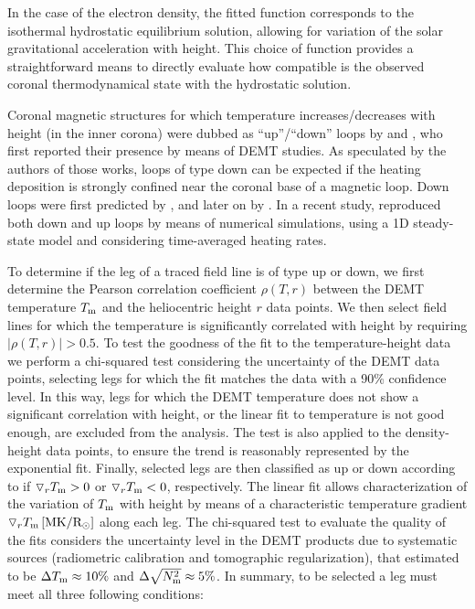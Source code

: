 \documentclass[namedreferences]{solarphysics}
\newcommand{\mrsun}{{\rm R_\odot}}
\newcommand{\MK}{{\rm MK}}
\newcommand{\dr}{\triangledown_r}
\newcommand{\Tm}{T_{\rm m}}
\newcommand{\Nsqm}{N^2_{{\rm m}}}
\newcommand{\rhoTr}{\rho(T,r)}
\newcommand{\sqravgN}{\sqrt{\Nsqm}}
\begin{document}
\begin{article}
In the case of the electron density, the fitted function corresponds to the isothermal hydrostatic equilibrium solution, allowing for variation of the solar gravitational acceleration with height. This choice of function provides a straightforward means to directly evaluate how compatible is the observed coronal thermodynamical state with the hydrostatic solution.

{Coronal magnetic structures for which temperature increases/decreases with height (in the inner corona) were dubbed as “up”/“down” loops by \citet{huang_2012} and \citet{nuevo_2013}, who first reported their presence by means of DEMT studies. As speculated by the authors of those works, loops of type down can be expected if the heating deposition is strongly confined near the coronal base of a magnetic loop. Down loops were first predicted by \citet{serio_1981}, and later on by \citet{aschwanden_2002}. In a recent study, \citet{schiff_2016} reproduced both down and up loops by means of numerical simulations, using a 1D steady-state model and {considering time-averaged heating rates.}}

{To determine if the leg of a traced field line is} of type up or down, we first determine the Pearson correlation coefficient $\rhoTr$ between the DEMT temperature $\Tm$ and the heliocentric height $r$ data points. We then select field lines for which the temperature {is significantly correlated with height} by requiring $|\rhoTr| > 0.5$. {To test the goodness of the fit to the temperature-height data we perform a chi-squared test \citep{recipes} considering the uncertainty of the DEMT data points, selecting legs for which the fit matches the data with a 90\% confidence level.} In this way, legs for which the DEMT temperature does not show a significant {correlation} with height, or the linear fit to temperature is {not} good enough, are {excluded from the} analysis. {The test is also applied to the density-height data points, to ensure the trend is reasonably represented by the exponential fit.} Finally, selected legs are then classified as up or down according to if $\dr\Tm > 0$ or $\dr\Tm < 0$, respectively. The linear fit allows characterization of the variation of $\Tm$ with height by means of a characteristic temperature gradient $\dr \Tm\,[\MK/\mrsun]$ along each leg. {The chi-squared test to evaluate the quality of the fits considers the uncertainty level in the DEMT products due to systematic sources (radiometric calibration and tomographic regularization), that \citet{lloveras_2017} estimated to be $\Delta\Tm\approx 10\%$ and $\Delta\sqravgN\approx 5\%$.} In summary, to be selected a leg must meet all three following conditions:


\end{article}
\end{document}
